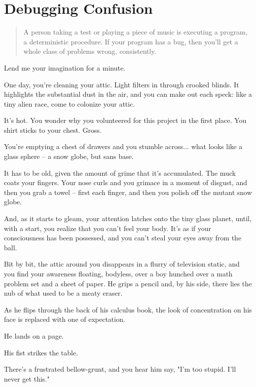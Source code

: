 
\section{Debugging Confusion}
\begin{quote}
A person taking a test or playing a piece of music is executing a program, a
deterministic procedure.  If your program has a bug, then you'll get a whole
class of problems wrong, consistently.
\end{quote}

Lend me your imagination for a minute.

One day, you're cleaning your attic. Light filters in through crooked blinds. It
highlights the substantial dust in the air, and you can make out
each speck: like a tiny alien race, come to colonize your attic. 

It's hot. You wonder why you volunteered for this project in the first
place. You shirt sticks to your chest. Gross.

You're emptying a chest of drawers and you stumble across...  what
looks like a glass sphere -- a snow globe, but sans base.

It has to be old, given the amount of grime that it's accumulated. The muck
coats your fingers. Your nose curls and you grimace in a moment of disgust, and then you grab a
towel -- first each finger, and then you polish off the mutant snow
globe.

And, as it starts to gleam, your attention latches onto the tiny glass planet,
until, with a start, you realize that you can't feel your body. It's as if your
consciousness has been possessed, and you can't steal your eyes away from the
ball.

Bit by bit, the attic around you disappears in a flurry of television static, and you find your awareness floating,
bodyless, over a boy hunched over a math problem set and a sheet of paper. He
grips a pencil and, by his side, there lies the nub of what used to be a meaty
eraser.

As he flips through the back of his calculus book, the look of concentration on
his face is replaced with one of expectation.

He lands on a page. 

His fist strikes the table.

There's a frustrated bellow-grunt, and you hear him say, "I'm too stupid. I'll
never get this."

